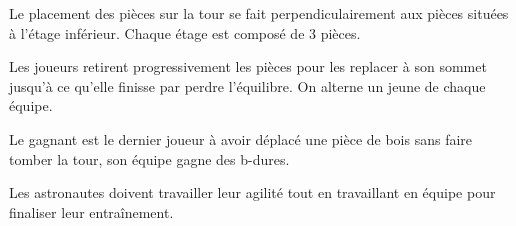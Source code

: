 \documentclass{grand-jeu}
\begin{document}
\begin{liste-materiel}
\end{liste-materiel}

\begin{regles}
Le placement des pièces sur la tour se fait perpendiculairement aux pièces situées à l'étage inférieur. Chaque étage est composé de 3 pièces.

Les joueurs retirent progressivement les pièces pour les replacer à son sommet jusqu'à ce qu'elle finisse par perdre l'équilibre. On alterne un jeune de chaque équipe.

Le gagnant est le dernier joueur à avoir déplacé une pièce de bois sans faire tomber la tour, son équipe gagne des b-dures.
\end{regles}

\begin{imaginaire}
Les astronautes doivent travailler leur agilité tout en travaillant en équipe pour finaliser leur entraînement. 
\end{imaginaire}

\begin{moments-stop}
\end{moments-stop}
\end{document}
